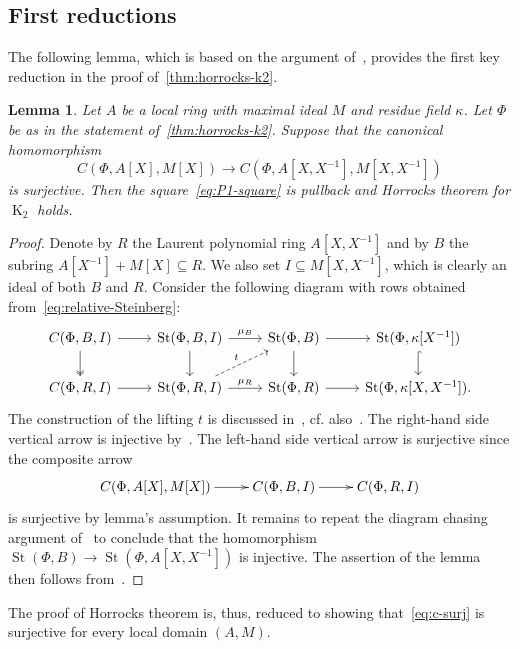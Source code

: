 \documentclass[oneside, 10pt]{amsart}
\DeclareMathOperator{\St}{St}
\DeclareMathOperator{\K}{K}
\newcommand{\inv}{^{-1}}
\numberwithin{equation}{section}
\numberwithin{thm}{section}
\newtheorem{lemma}[thm]{Lemma}
\numberwithin{lemma}{section}
\theoremstyle{definition}
\theoremstyle{remark}
\begin{document}
\subsection{First reductions} \label{subsec:structure-theorem-overview}

The following lemma, which is based on the argument of~\cite[Theorem~2]{LS20},
provides the first key reduction in the proof of~\cref{thm:horrocks-k2}.
\begin{lemma} \label{lem:first-reduction}
Let $A$ be a local ring with maximal ideal $M$ and residue field $\kappa$.
Let $\Phi$ be as in the statement of~\cref{thm:horrocks-k2}.
Suppose that the canonical homomorphism
\begin{equation} \label{eq:c-surj} C(\Phi, A[X], M[X]) \to C(\Phi, A[X, X\inv], M[X, X\inv]) \end{equation}
is surjective.
Then the square~\eqref{eq:P1-square} is pullback and Horrocks theorem for $\K_2$ holds.
\end{lemma}
\begin{proof}
Denote by $R$ the Laurent polynomial ring $A[X, X\inv]$ and by $B$ the subring $A[X\inv] + M[X] \subseteq R$.
We also set $I \subseteq M[X, X\inv]$, which is clearly an ideal of both $B$ and $R$.
Consider the following diagram with rows obtained from~\eqref{eq:relative-Steinberg}:
\[\begin{tikzcd}
C(\Phi, B, I) \arrow{r} \arrow[d, swap, twoheadrightarrow] & \St(\Phi, B, I) \arrow{r}{\mu_B} \arrow{d} & \St(\Phi, B) \arrow{r} \arrow{d} & \St(\Phi, \kappa[X^{-1}]) \arrow[hookrightarrow]{d} \\
C(\Phi, R, I) \arrow{r} & \St(\Phi, R, I) \arrow{r}{\mu_R} \arrow[ur, "t", dashrightarrow] & \St(\Phi, R) \arrow{r} & \St(\Phi, \kappa[X, X^{-1}]).
\end{tikzcd}\]
The construction of the lifting $t$ is discussed in~\cite[\S~2]{LS17}, cf. also~\cite[Lemma~3.3]{LS20}.
The right-hand side vertical arrow is injective by~\cite[Lemma~2.2]{LS20}.
The left-hand side vertical arrow is surjective since the composite arrow
\[\xymatrix{ C(\Phi, A[X], M[X]) \ar[r] & C(\Phi, B, I) \ar[r] & C(\Phi, R, I) }\]
is surjective by lemma's assumption.
It remains to repeat the diagram chasing argument of~\cite[Theorem~1]{LS20} to conclude that the homomorphism $\St(\Phi, B) \to \St(\Phi, A[X, X\inv])$ is injective.
The assertion of the lemma then follows from~\cite[Theorem~3]{LS20}.
\end{proof}
The proof of Horrocks theorem is, thus, reduced to showing that~\eqref{eq:c-surj} is surjective for every local domain $(A, M)$.
\end{document}
